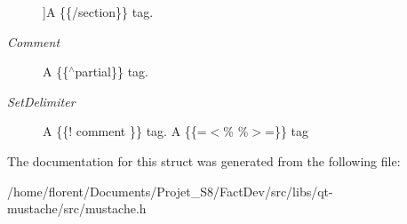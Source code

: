 \begin{Desc}
\begin{description}
{}]A \{\{/section\}\} tag. \item[{\em 
\hypertarget{structMustache_1_1Tag_ab702ed1288811f8bb16d76babfdb6472a85c0e87f362943cf0244792873edd478}{Comment}\label{structMustache_1_1Tag_ab702ed1288811f8bb16d76babfdb6472a85c0e87f362943cf0244792873edd478}
}]A \{\{$^\wedge$partial\}\} tag. \item[{\em 
\hypertarget{structMustache_1_1Tag_ab702ed1288811f8bb16d76babfdb6472a680bf1878bdfa8c7ed5a594603b638be}{Set\-Delimiter}\label{structMustache_1_1Tag_ab702ed1288811f8bb16d76babfdb6472a680bf1878bdfa8c7ed5a594603b638be}
}]A \{\{! comment \}\} tag. A \{\{=$<$\% \%$>$=\}\} tag \end{description}
\end{Desc}


The documentation for this struct was generated from the following file\-:\begin{DoxyCompactItemize}
\item 
/home/florent/\-Documents/\-Projet\-\_\-\-S8/\-Fact\-Dev/src/libs/qt-\/mustache/src/mustache.\-h\end{DoxyCompactItemize}
